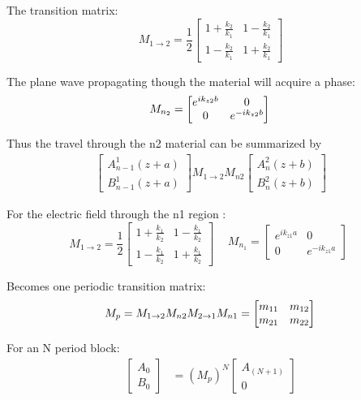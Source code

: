 The transition matrix:
\begin{equation}
	M_{1\rightarrow2} = 
	\frac{1}{2}\begin{bmatrix}1+\frac{k_2}{k_1} & 1-\frac{k_2}{k_1}\\1-\frac{k_2}{k_1} & 1+\frac{k_2}{k_1}\end{bmatrix}
\end{equation}

The plane wave propagating though the material will acquire a phase:  
\begin{equation}
	M_{n_2} = \begin{bmatrix}e^{ik_{z2}b} & 0\\0 & e^{-ik_{z2}b}\end{bmatrix}\\
\end{equation}

Thus the travel through the n2 material can be summarized by
\begin{equation}
	\begin{aligned}
		\begin{bmatrix}A^1_{n-1}(z+a)\\B^1_{n-1}(z+a) \end{bmatrix}
		M_{1\rightarrow2}M_{n2}
		\begin{bmatrix}A^2_n(z+b)\\B^2_n(z+b) \end{bmatrix}
	\end{aligned}
\end{equation}

For the electric field through the n1 region :
\begin{equation}
	M_{1\rightarrow2} = 
	\frac{1}{2}\begin{bmatrix}
		1+\frac{k_1}{k_2} & 1-\frac{k_1}{k_2}\\
		1-\frac{k_1}{k_2} & 1+\frac{k_1}{k_2}
	\end{bmatrix}
	\begin{aligned}
		&M_{n_1} =
		\begin{bmatrix}
			e^{ik_{z1}a} & 0\\
			0 & e^{-ik_{z1}a}
		\end{bmatrix}\\
	\end{aligned}
\end{equation}

Becomes one periodic transition matrix:
\begin{equation*}
	M_p = M_{1\rightarrow2}M_{n2}M_{2\rightarrow1}M_{n1} = \begin{bmatrix}m_{11} & m_{12}\\m_{21} & m_{22}\end{bmatrix}\\ 	
\end{equation*}

For an N period block:
\begin{equation}
	\begin{aligned}
		\begin{bmatrix}A_0\\B_0 \end{bmatrix} 
		&=(M_p)^N 
		\begin{bmatrix}A_{(N+1)}\\0\end{bmatrix}\\
	\end{aligned}
\end{equation}
